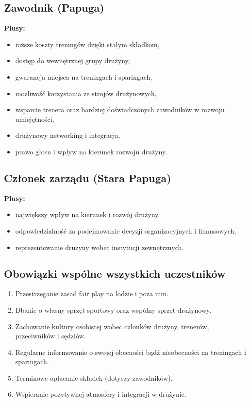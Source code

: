 \documentclass[12pt,a4paper]{article}
\begin{document}
\subsection{Zawodnik (Papuga)}
\textbf{Plusy:}
\begin{itemize}
    \item niższe koszty treningów dzięki stałym składkom,
    \item dostęp do wewnętrznej grupy drużyny,
    \item gwarancja miejsca na treningach i sparingach,
    \item możliwość korzystania ze strojów drużynowych,
    \item wsparcie trenera oraz bardziej doświadczonych zawodników w rozwoju umiejętności,
    \item drużynowy networking i integracja,
    \item prawo głosu i wpływ na kierunek rozwoju drużyny.
\end{itemize}

\subsection{Członek zarządu (Stara Papuga)}
\textbf{Plusy:}
\begin{itemize}
    \item największy wpływ na kierunek i rozwój drużyny,
    \item odpowiedzialność za podejmowanie decyzji organizacyjnych i finansowych,
    \item reprezentowanie drużyny wobec instytucji zewnętrznych.
\end{itemize}

\subsection{Obowiązki wspólne wszystkich uczestników}
\begin{enumerate}
    \item Przestrzeganie zasad fair play na lodzie i poza nim.
    \item Dbanie o własny sprzęt sportowy oraz wspólny sprzęt drużynowy.
    \item Zachowanie kultury osobistej wobec członków drużyny, trenerów, przeciwników i sędziów.
    \item Regularne informowanie o swojej obecności bądź nieobecności na treningach i sparingach.
    \item Terminowe opłacanie składek (dotyczy zawodników).
    \item Wspieranie pozytywnej atmosfery i integracji w drużynie.
\end{enumerate}
\end{document}
